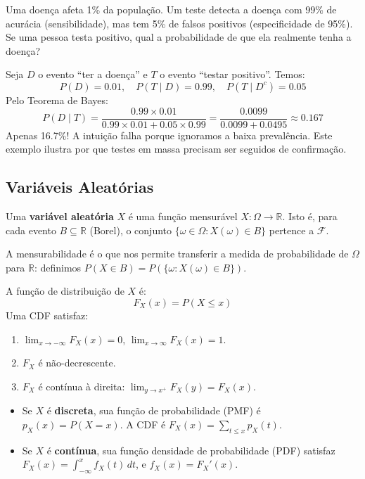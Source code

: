 \documentclass{tufte-handout}
\begin{document}
\begin{exmp}
    Uma doença afeta 1\% da população. Um teste detecta a doença com 99\% de acurácia
    (sensibilidade), mas tem 5\% de falsos positivos (especificidade de 95\%). Se uma pessoa
    testa positivo, qual a probabilidade de que ela realmente tenha a doença?

    Seja $D$ o evento ``ter a doença'' e $T$ o evento ``testar positivo''. Temos:
    \[
    P(D) = 0.01,\quad P(T\mid D) = 0.99,\quad P(T\mid D^c) = 0.05
    \]
    Pelo Teorema de Bayes:
    \[
    P(D\mid T) = \frac{0.99 \times 0.01}{0.99 \times 0.01 + 0.05 \times 0.99}
    = \frac{0.0099}{0.0099 + 0.0495} \approx 0.167
    \]
    Apenas 16.7\%! A intuição falha porque ignoramos a baixa prevalência. Este exemplo
    ilustra por que testes em massa precisam ser seguidos de confirmação.
\end{exmp}

\subsection{Variáveis Aleatórias}

\begin{defn}
    Uma \textbf{variável aleatória} $X$ é uma função mensurável $X: \Omega \to \mathbb{R}$.
    Isto é, para cada evento $B \subseteq \mathbb{R}$ (Borel), o conjunto
    $\{\omega \in \Omega : X(\omega) \in B\}$ pertence a $\mathcal{F}$.
\end{defn}

A mensurabilidade é o que nos permite transferir a medida de probabilidade de $\Omega$ para
$\mathbb{R}$: definimos $P(X \in B) = P(\{\omega : X(\omega) \in B\})$.

\begin{defn}
    A função de distribuição de $X$ é:
    \[
    F_X(x) = P(X \le x)
    \]
    Uma CDF satisfaz:
    \begin{enumerate}
        \item $\lim_{x\to -\infty} F_X(x) = 0$, $\lim_{x\to\infty} F_X(x) = 1$.
        \item $F_X$ é não-decrescente.
        \item $F_X$ é contínua à direita: $\lim_{y \to x^+} F_X(y) = F_X(x)$.
    \end{enumerate}
\end{defn}

\begin{defn}
    \begin{itemize}
        \item Se $X$ é \textbf{discreta}, sua função de probabilidade (PMF) é
        $p_X(x) = P(X = x)$. A CDF é $F_X(x) = \sum_{t \le x} p_X(t)$.
        \item Se $X$ é \textbf{contínua}, sua função densidade de probabilidade (PDF)
        satisfaz $F_X(x) = \int_{-\infty}^x f_X(t)\,dt$, e $f_X(x) = F_X'(x)$.
    \end{itemize}
\end{defn}
\end{document}
